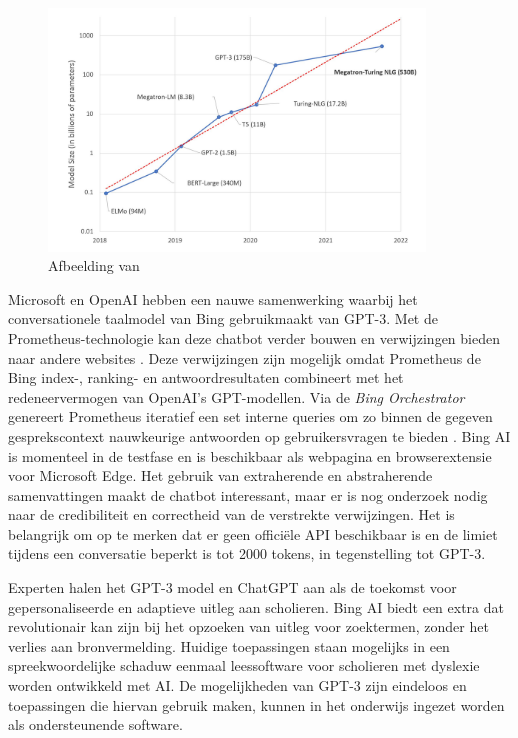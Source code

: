 \begin{figure}[H]
	\begin{center}
		\includegraphics[width=10cm]{img/graph-language-models.png}
		\caption{Afbeelding van \textcite{Simon2021}}
		\label{img:graph-language-models}
	\end{center}
\end{figure}

\medspace

Microsoft en OpenAI hebben een nauwe samenwerking waarbij het conversationele taalmodel van Bing gebruikmaakt van GPT-3. Met de Prometheus-technologie kan deze chatbot verder bouwen en verwijzingen bieden naar andere websites \autocite{Ribas2023}. Deze verwijzingen zijn mogelijk omdat Prometheus de Bing index-, ranking- en antwoordresultaten combineert met het redeneervermogen van OpenAI’s GPT-modellen. Via de \textit{Bing Orchestrator} genereert Prometheus iteratief een set interne queries om zo binnen de gegeven gesprekscontext nauwkeurige antwoorden op gebruikersvragen te bieden \autocite{Ribas2023}. Bing AI is momenteel in de testfase en is beschikbaar als webpagina en browserextensie voor Microsoft Edge. Het gebruik van extraherende en abstraherende samenvattingen maakt de chatbot interessant, maar er is nog onderzoek nodig naar de credibiliteit en correctheid van de verstrekte verwijzingen. Het is belangrijk om op te merken dat er geen officiële API beschikbaar is en de limiet tijdens een conversatie beperkt is tot 2000 tokens, in tegenstelling tot GPT-3.

\medspace

Experten halen het GPT-3 model en ChatGPT aan als de toekomst voor gepersonaliseerde en adaptieve uitleg aan scholieren. Bing AI biedt een extra dat revolutionair kan zijn bij het opzoeken van uitleg voor zoektermen, zonder het verlies aan bronvermelding. Huidige toepassingen staan mogelijks in een spreekwoordelijke schaduw eenmaal leessoftware voor scholieren met dyslexie worden ontwikkeld met AI. De mogelijkheden van GPT-3 zijn eindeloos en toepassingen die hiervan gebruik maken, kunnen in het onderwijs ingezet worden als ondersteunende software.

